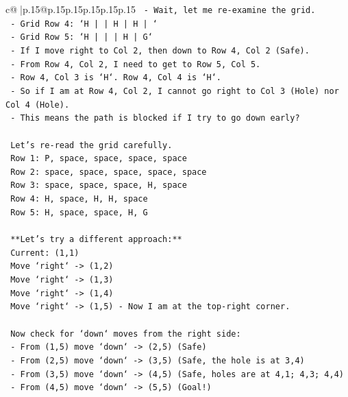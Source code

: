 \documentclass{article}
\begin{document}
{\begin{supertabular}{c@{$\;$}|p{.15\linewidth}@{}p{.15\linewidth}p{.15\linewidth}p{.15\linewidth}p{.15\linewidth}p{.15\linewidth}}
{{{\texttt{    {-} Wait, let me re{-}examine the grid.} \\
\texttt{    {-} Grid Row 4: `H | | H | H | `} \\
\texttt{    {-} Grid Row 5: `H | | | H | G`} \\
\texttt{    {-} If I move right to Col 2, then down to Row 4, Col 2 (Safe).} \\
\texttt{    {-} From Row 4, Col 2, I need to get to Row 5, Col 5.} \\
\texttt{    {-} Row 4, Col 3 is `H`. Row 4, Col 4 is `H`.} \\
\texttt{    {-} So if I am at Row 4, Col 2, I cannot go right to Col 3 (Hole) nor Col 4 (Hole).} \\
\texttt{    {-} This means the path is blocked if I try to go down early?} \\
\\ 
\texttt{    Let's re{-}read the grid carefully.} \\
\texttt{    Row 1: P, space, space, space, space} \\
\texttt{    Row 2: space, space, space, space, space} \\
\texttt{    Row 3: space, space, space, H, space} \\
\texttt{    Row 4: H, space, H, H, space} \\
\texttt{    Row 5: H, space, space, H, G} \\
\\ 
\texttt{    **Let's try a different approach:**} \\
\texttt{    Current: (1,1)} \\
\texttt{    Move `right` {-}> (1,2)} \\
\texttt{    Move `right` {-}> (1,3)} \\
\texttt{    Move `right` {-}> (1,4)} \\
\texttt{    Move `right` {-}> (1,5) {-} Now I am at the top{-}right corner.} \\
\\ 
\texttt{    Now check for `down` moves from the right side:} \\
\texttt{    {-} From (1,5) move `down` {-}> (2,5) (Safe)} \\
\texttt{    {-} From (2,5) move `down` {-}> (3,5) (Safe, the hole is at 3,4)} \\
\texttt{    {-} From (3,5) move `down` {-}> (4,5) (Safe, holes are at 4,1; 4,3; 4,4)} \\
\texttt{    {-} From (4,5) move `down` {-}> (5,5) (Goal!)} \\
}}}
\end{supertabular}}
\end{document}
